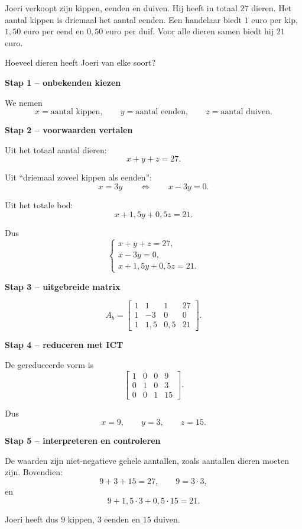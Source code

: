 \documentclass{ximera}
\begin{document}
\begin{voorbeeld}

Joeri verkoopt zijn kippen, eenden en duiven. Hij heeft in totaal \(27\)
dieren. Het aantal kippen is driemaal het aantal eenden. Een handelaar biedt
\(1\) euro per kip, \(1{,}50\) euro per eend en \(0{,}50\) euro per duif.
Voor alle dieren samen biedt hij \(21\) euro.

Hoeveel dieren heeft Joeri van elke soort?

\textbf{Stap 1 -- onbekenden kiezen}

We nemen
\[
x=\text{aantal kippen},\qquad
y=\text{aantal eenden},\qquad
z=\text{aantal duiven}.
\]

\textbf{Stap 2 -- voorwaarden vertalen}

Uit het totaal aantal dieren:
\[
x+y+z=27.
\]

Uit ``driemaal zoveel kippen als eenden'':
\[
x=3y
\qquad\Longleftrightarrow\qquad
x-3y=0.
\]

Uit het totale bod:
\[
x+1{,}5y+0{,}5z=21.
\]

Dus
\[
\begin{cases}
x+y+z=27,\\
x-3y=0,\\
x+1{,}5y+0{,}5z=21.
\end{cases}
\]

\textbf{Stap 3 -- uitgebreide matrix}

\[
A_b=
\left[
\begin{array}{ccc|c}
1&1&1&27\\
1&-3&0&0\\
1&1{,}5&0{,}5&21
\end{array}
\right].
\]

\textbf{Stap 4 -- reduceren met ICT}

De gereduceerde vorm is
\[
\left[
\begin{array}{ccc|c}
1&0&0&9\\
0&1&0&3\\
0&0&1&15
\end{array}
\right].
\]

Dus
\[
x=9,\qquad y=3,\qquad z=15.
\]

\textbf{Stap 5 -- interpreteren en controleren}

De waarden zijn niet-negatieve gehele aantallen, zoals aantallen dieren
moeten zijn. Bovendien:
\[
9+3+15=27,\qquad 9=3\cdot3,
\]
en
\[
9+1{,}5\cdot3+0{,}5\cdot15=21.
\]

Joeri heeft dus \(9\) kippen, \(3\) eenden en \(15\) duiven.

\end{voorbeeld}
\end{document}
